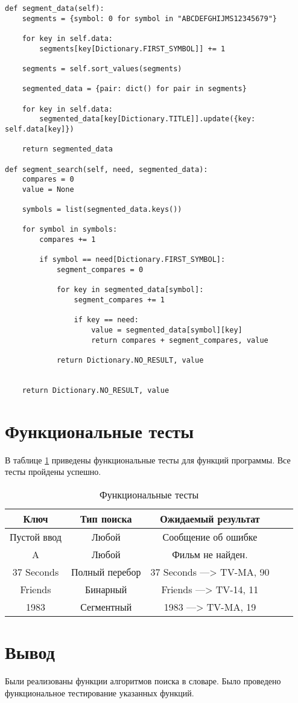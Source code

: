 \begin{center}
\captionsetup{justification=raggedright,singlelinecheck=off}
\begin{lstlisting}[label=lst:segment,caption=Сегментный поиск]
def segment_data(self):
    segments = {symbol: 0 for symbol in "ABCDEFGHIJMS12345679"}

    for key in self.data:
        segments[key[Dictionary.FIRST_SYMBOL]] += 1

    segments = self.sort_values(segments)

    segmented_data = {pair: dict() for pair in segments}

    for key in self.data:
        segmented_data[key[Dictionary.TITLE]].update({key: self.data[key]})
        
    return segmented_data

def segment_search(self, need, segmented_data):
    compares = 0
    value = None

    symbols = list(segmented_data.keys())

    for symbol in symbols:
        compares += 1

        if symbol == need[Dictionary.FIRST_SYMBOL]:
            segment_compares = 0

            for key in segmented_data[symbol]:
                segment_compares += 1

                if key == need:
                    value = segmented_data[symbol][key]
                    return compares + segment_compares, value
                
            return Dictionary.NO_RESULT, value

        
    return Dictionary.NO_RESULT, value
\end{lstlisting}
\end{center}

\section{Функциональные тесты}

В таблице \ref{tbl:func_test} приведены функциональные тесты для функций программы. Все тесты пройдены успешно.

\begin{center}
    \captionsetup{justification=raggedright,singlelinecheck=off}
    \begin{longtable}[c]{|c|c|c|c|c|}
    \caption{Функциональные тесты\label{tbl:func_test}} \\ \hline
		Ключ & Тип поиска & Ожидаемый результат \\
		\hline
		Пустой ввод &
		Любой &
		Сообщение об ошибке \\
		\hline
		A &
		Любой &
		Фильм не найден. \\
		\hline
		37 Seconds &
		Полный перебор &
		37 Seconds ---> TV-MA, 90 \\
		\hline
		Friends &
		Бинарный &
		Friends ---> TV-14, 11 \\
		\hline
		1983 &
		Сегментный &
		1983 ---> TV-MA, 19 \\
		\hline
	\end{longtable}
\end{center}

\section{Вывод}

Были реализованы функции алгоритмов поиска в словаре. Было проведено функциональное тестирование указанных функций.